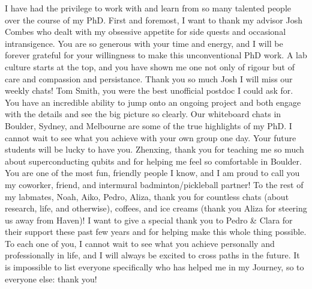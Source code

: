

I have had the privilege to work with and learn from so many talented people over the course of my PhD.
First and foremost, I want to thank my advisor Josh Combes who dealt with my obsessive appetite for side quests and occasional intransigence.
You are so generous with your time and energy, and I will be forever grateful for your willingness to make this unconventional PhD work. 
A lab culture starts at the top, and you have shown me one not only of rigour but of care and compassion and persistance.
Thank you so much Josh I will miss our weekly chats!
Tom Smith, you were the best unofficial postdoc I could ask for.
You have an incredible ability to jump onto an ongoing project and both engage with the details and see the big picture so clearly.
Our whiteboard chats in Boulder, Sydney, and Melbourne are some of the true highlights of my PhD.
I cannot wait to see what you achieve with your own group one day.
Your future students will be lucky to have you.
Zhenxing, thank you for teaching me so much about superconducting qubits and for helping me feel so comfortable in Boulder. You are one of the most fun, friendly people I know, and I am proud to call you my coworker, friend, and intermural badminton/pickleball partner!
To the rest of my labmates, Noah, Aiko, Pedro, Aliza, thank you for countless chats (about research, life, and otherwise), coffees, and ice creams (thank you Aliza for steering us away from Haven)!
I want to give a special thank you to Pedro \& Clara for their support these past few years and for helping make this whole thing possible.
To each one of you, I cannot wait to see what you achieve personally and professionally in life, and I will always be excited to cross paths in the future.
It is impossible to list everyone specifically who has helped me in my Journey, so to everyone else: thank you!
